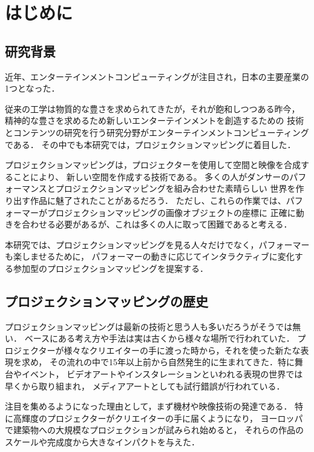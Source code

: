 \chapter{はじめに}
\thispagestyle{fancy}
\setcounter{page}{1}
\renewcommand{\thepage}{\arabic{page}}

\section{研究背景}
近年、エンターテインメントコンピューティングが注目され，日本の主要産業の1つとなった．

従来の工学は物質的な豊さを求められてきたが，それが飽和しつつある昨今，
精神的な豊さを求めるため新しいエンターテインメントを創造するための
技術とコンテンツの研究を行う研究分野がエンターテインメントコンピューティングである．
その中でも本研究では，プロジェクションマッピングに着目した．

プロジェクションマッピングは，プロジェクターを使用して空間と映像を合成することにより、
新しい空間を作成する技術である。
多くの人がダンサーのパフォーマンスとプロジェクションマッピングを組み合わせた素晴らしい
世界を作り出す作品に魅了されたことがあるだろう．
ただし、これらの作業では、パフォーマーがプロジェクションマッピングの画像オブジェクトの座標に
正確に動きを合わせる必要があるが、これは多くの人に取って困難であると考える．

本研究では、プロジェクションマッピングを見る人々だけでなく，パフォーマーも楽しませるために，
パフォーマーの動きに応じてインタラクティブに変化する参加型のプロジェクションマッピングを提案する．

\clearpage

\section{プロジェクションマッピングの歴史}
プロジェクションマッピングは最新の技術と思う人も多いだろうがそうでは無い．
ベースにある考え方や手法は実は古くから様々な場所で行われていた．
プロジェクターが様々なクリエイターの手に渡った時から，それを使った新たな表現を求め，
その流れの中で15年以上前から自然発生的に生まれてきた．特に舞台やイベント，
ビデオアートやインスタレーションといわれる表現の世界では早くから取り組まれ，
メディアアートとしても試行錯誤が行われている．

注目を集めるようになった理由として，まず機材や映像技術の発達である．
特に高輝度のプロジェクターがクリエイターの手に届くようになり，
ヨーロッパで建築物への大規模なプロジェクションが試みられ始めると，
それらの作品のスケールや完成度から大きなインパクトを与えた．


